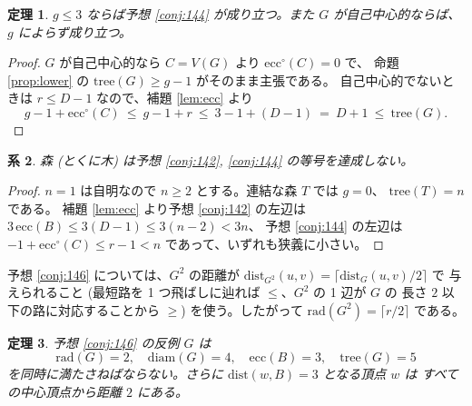 \documentclass[paper=a4,fontsize=10.5pt,jafontsize=10.5pt]{jlreq}
\theoremstyle{plain}
\newtheorem{theorem}{定理}[section]
\newtheorem{corollary}[theorem]{系}
\theoremstyle{definition}
\begin{document}
\begin{theorem}\label{thm:144g3}
$g \le 3$ ならば予想 \ref{conj:144} が成り立つ。また $G$ が自己中心的ならば、
$g$ によらず成り立つ。
\end{theorem}

\begin{proof}
$G$ が自己中心的なら $C = V(G)$ より $\mathrm{ecc}^{\circ}(C) = 0$ で、
命題 \ref{prop:lower} の $\mathrm{tree}(G) \ge g-1$ がそのまま主張である。
自己中心的でないときは $r \le D - 1$ なので、補題 \ref{lem:ecc} より
\[ g - 1 + \mathrm{ecc}^{\circ}(C) \ \le \ g - 1 + r
   \ \le \ 3 - 1 + (D-1) \ = \ D + 1 \ \le \ \mathrm{tree}(G) . \]
\end{proof}

\begin{corollary}\label{cor:tree}
森 (とくに木) は予想 \ref{conj:142}, \ref{conj:144} の等号を達成しない。
\end{corollary}

\begin{proof}
$n = 1$ は自明なので $n \ge 2$ とする。連結な森 $T$ では $g = 0$、
$\mathrm{tree}(T) = n$ である。
補題 \ref{lem:ecc} より予想 \ref{conj:142} の左辺は
$3\,\mathrm{ecc}(B) \le 3(D-1) \le 3(n-2) < 3n$、
予想 \ref{conj:144} の左辺は $-1 + \mathrm{ecc}^{\circ}(C) \le r - 1 < n$
であって、いずれも狭義に小さい。
\end{proof}

予想 \ref{conj:146} については、$G^2$ の距離が
$\mathrm{dist}_{G^2}(u,v) = \lceil \mathrm{dist}_G(u,v)/2 \rceil$ で
与えられること (最短路を 1 つ飛ばしに辿れば $\le$、$G^2$ の 1 辺が $G$ の
長さ $2$ 以下の路に対応することから $\ge$) を使う。したがって
$\mathrm{rad}(G^2) = \lceil r/2 \rceil$ である。

\begin{theorem}\label{thm:146}
予想 \ref{conj:146} の反例 $G$ は
\[ \mathrm{rad}(G) = 2, \quad \mathrm{diam}(G) = 4, \quad
   \mathrm{ecc}(B) = 3, \quad \mathrm{tree}(G) = 5 \]
を同時に満たさねばならない。さらに $\mathrm{dist}(w, B) = 3$ となる頂点 $w$ は
すべての中心頂点から距離 $2$ にある。
\end{theorem}
\end{document}

